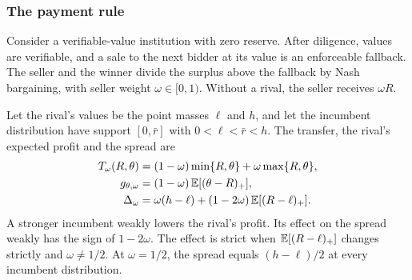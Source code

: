 \subsubsection*{The payment rule}

Consider a verifiable-value institution with zero reserve. After diligence, values are verifiable, and a sale to the next bidder at its value is an enforceable fallback. The seller and the winner divide the surplus above the
fallback by Nash bargaining, with seller weight \(\omega\in[0,1)\). Without a rival, the seller receives
\(\omega R\).

\begin{proposition}\label{prop:payment}
Let the rival's values be the point masses \(\ell\) and \(h\), and let the incumbent distribution have support
\([0,\bar r]\) with \(0<\ell<\bar r<h\). The transfer, the rival's expected profit and the spread are
\[
\begin{aligned}
T_\omega(R,\theta)&=(1-\omega)\min\{R,\theta\}+\omega\max\{R,\theta\},\\
g_{\theta,\omega}&=(1-\omega)\,\mathbb{E}[(\theta-R)_+],\\
\Delta_\omega&=\omega(h-\ell)+(1-2\omega)\,\mathbb{E}[(R-\ell)_+].
\end{aligned}
\]
A stronger incumbent weakly lowers the rival's profit. Its effect on the spread weakly has the sign of
\(1-2\omega\). The effect is strict when \(\mathbb{E}[(R-\ell)_+]\) changes strictly and \(\omega\ne1/2\). At \(\omega=1/2\), the
spread equals \((h-\ell)/2\) at every incumbent distribution.
\end{proposition}

